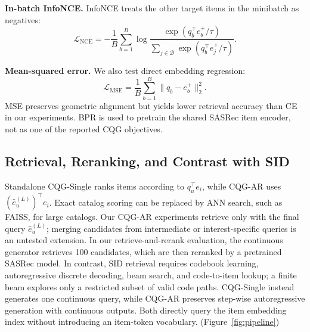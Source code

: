 \documentclass[letterpaper]{article}
\begin{document}
\textbf{In-batch InfoNCE.}
InfoNCE treats the other target items in the minibatch as negatives:
\begin{equation}
\mathcal{L}_{\mathrm{NCE}}
=-\frac{1}{B}\sum_{b=1}^{B}\log
\frac{\exp(q_b^\top e_b^+/\tau)}
{\sum_{j\in\mathcal B}\exp(q_b^\top e_j^+/\tau)} .
\end{equation}

\textbf{Mean-squared error.}
We also test direct embedding regression:
\begin{equation}
\mathcal{L}_{\mathrm{MSE}}
=\frac{1}{B}\sum_{b=1}^{B}\|q_b-e_b^+\|_2^2 .
\end{equation}
MSE preserves geometric alignment but yields lower retrieval accuracy than CE
in our experiments. BPR is used to pretrain the shared SASRec item encoder,
not as one of the reported CQG objectives.

\subsection{Retrieval, Reranking, and Contrast with SID}

Standalone CQG-Single ranks items according to $q_u^\top e_i$, while CQG-AR uses $(\hat e_u^{(L)})^\top e_i$. Exact catalog scoring can be replaced by ANN search, such as FAISS, for large catalogs. Our CQG-AR experiments retrieve only with the final query \(\hat e_u^{(L)}\); merging candidates from intermediate or interest-specific queries is an untested extension. In our retrieve-and-rerank evaluation, the continuous generator retrieves 100 candidates, which are then reranked by a pretrained SASRec model. In contrast, SID retrieval requires codebook learning, autoregressive discrete decoding, beam search, and code-to-item lookup; a finite beam explores only a restricted subset of valid code paths. CQG-Single instead generates one continuous query, while CQG-AR preserves step-wise autoregressive generation with continuous outputs. Both directly query the item embedding index without introducing an item-token vocabulary. (Figure~\ref{fig:pipeline})


\end{document}
